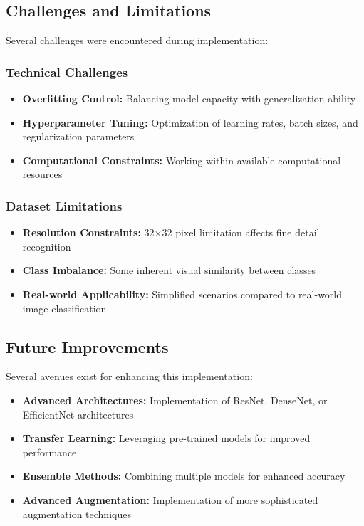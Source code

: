 \documentclass[11pt,a4paper]{article}
\begin{document}
\subsection{Challenges and Limitations}

Several challenges were encountered during implementation:

\subsubsection{Technical Challenges}

\begin{itemize}
    \item \textbf{Overfitting Control:} Balancing model capacity with generalization ability
    \item \textbf{Hyperparameter Tuning:} Optimization of learning rates, batch sizes, and regularization parameters
    \item \textbf{Computational Constraints:} Working within available computational resources
\end{itemize}

\subsubsection{Dataset Limitations}

\begin{itemize}
    \item \textbf{Resolution Constraints:} 32×32 pixel limitation affects fine detail recognition
    \item \textbf{Class Imbalance:} Some inherent visual similarity between classes
    \item \textbf{Real-world Applicability:} Simplified scenarios compared to real-world image classification
\end{itemize}

\subsection{Future Improvements}

Several avenues exist for enhancing this implementation:

\begin{itemize}
    \item \textbf{Advanced Architectures:} Implementation of ResNet, DenseNet, or EfficientNet architectures
    \item \textbf{Transfer Learning:} Leveraging pre-trained models for improved performance
    \item \textbf{Ensemble Methods:} Combining multiple models for enhanced accuracy
    \item \textbf{Advanced Augmentation:} Implementation of more sophisticated augmentation techniques
\end{itemize}
\end{document}
